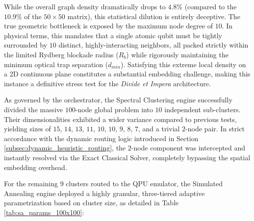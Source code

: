 While the overall graph density dramatically drops to $4.8\%$ (compared to the $10.9\%$ of the $50\times50$ matrix), this statistical dilution is entirely deceptive. The true geometric bottleneck is exposed by the maximum node degree of $10$. In physical terms, this mandates that a single atomic qubit must be tightly surrounded by $10$ distinct, highly-interacting neighbors, all packed strictly within the limited Rydberg blockade radius ($R_b$) while rigorously maintaining the minimum optical trap separation ($d_{min}$). Satisfying this extreme local density on a 2D continuous plane constitutes a substantial embedding challenge, making this instance a definitive stress test for the \textit{Divide et Impera} architecture.

As governed by the orchestrator, the Spectral Clustering engine successfully divided the massive $100$-node global problem into $10$ independent sub-clusters. Their dimensionalities exhibited a wider variance compared to previous tests, yielding sizes of $15$, $14$, $13$, $11$, $10$, $10$, $9$, $8$, $7$, and a trivial $2$-node pair. In strict accordance with the dynamic routing logic introduced in Section \ref{subsec:dynamic_heuristic_routing}, the $2$-node component was intercepted and instantly resolved via the Exact Classical Solver, completely bypassing the spatial embedding overhead. 

For the remaining $9$ clusters routed to the QPU emulator, the Simulated Annealing engine deployed a highly granular, three-tiered adaptive parametrization based on cluster size, as detailed in Table \ref{tab:sa_params_100x100}:

\begin{table}[H]
    \centering
    \caption{Three-tiered adaptive thermodynamic hyperparameter configuration deployed for the fragmented $100\times100$ QUBO instance.}
    \label{tab:sa_params_100x100}
\end{table}

